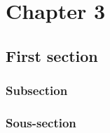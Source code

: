
\chapter{Chapter 3} \label{chap3:title}
\section{First section}

\subsection{Subsection}

\subsection{Sous-section}
